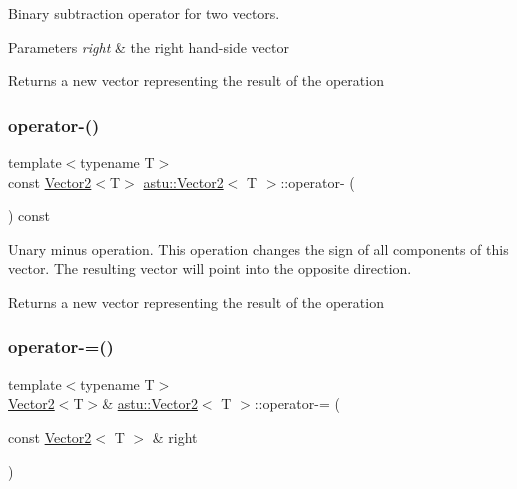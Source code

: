 Binary subtraction operator for two vectors.


\begin{DoxyParams}{Parameters}
{\em right} & the right hand-\/side vector \\
\hline
\end{DoxyParams}
\begin{DoxyReturn}{Returns}
a new vector representing the result of the operation 
\end{DoxyReturn}
\mbox{\label{classastu_1_1Vector2_aaa65baf8ffd013a0401c4875d91337a4}} 
\subsubsection{\texorpdfstring{operator-\/()}{operator-()}\hspace{0.1cm}{\footnotesize\ttfamily [2/2]}}
{\footnotesize\ttfamily template$<$typename T$>$ \\
const \hyperlink{classastu_1_1Vector2}{Vector2}$<$T$>$ \hyperlink{classastu_1_1Vector2}{astu\+::\+Vector2}$<$ T $>$\+::operator-\/ (\begin{DoxyParamCaption}{ }\end{DoxyParamCaption}) const\hspace{0.3cm}{\ttfamily [inline]}}

Unary minus operation. This operation changes the sign of all components of this vector. The resulting vector will point into the opposite direction.

\begin{DoxyReturn}{Returns}
a new vector representing the result of the operation 
\end{DoxyReturn}
\mbox{\label{classastu_1_1Vector2_a7022d1b830ee06d272a05d7d52c93a53}} 
\subsubsection{\texorpdfstring{operator-\/=()}{operator-=()}}
{\footnotesize\ttfamily template$<$typename T$>$ \\
\hyperlink{classastu_1_1Vector2}{Vector2}$<$T$>$\& \hyperlink{classastu_1_1Vector2}{astu\+::\+Vector2}$<$ T $>$\+::operator-\/= (\begin{DoxyParamCaption}\item[{const \hyperlink{classastu_1_1Vector2}{Vector2}$<$ T $>$ \&}]{right }\end{DoxyParamCaption})\hspace{0.3cm}{\ttfamily [inline]}}

